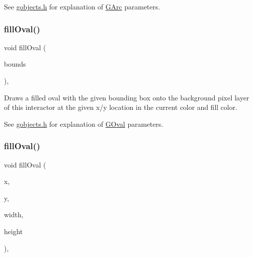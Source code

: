 See \mbox{\hyperlink{gobjects_8h_source}{gobjects.\+h}} for explanation of \mbox{\hyperlink{classsgl_1_1GArc}{G\+Arc}} parameters. \mbox{\label{classsgl_1_1GDrawingSurface_a1ea6e48d59fb588797dba4deab1397e0}} 
\subsubsection{\texorpdfstring{fill\+Oval()}{fillOval()}\hspace{0.1cm}{\footnotesize\ttfamily [1/2]}}
{\footnotesize\ttfamily void fill\+Oval (\begin{DoxyParamCaption}\item[{const \mbox{\hyperlink{structsgl_1_1GRectangle}{G\+Rectangle}} \&}]{bounds }\end{DoxyParamCaption})\hspace{0.3cm}{\ttfamily [virtual]}, {\ttfamily [inherited]}}



Draws a filled oval with the given bounding box onto the background pixel layer of this interactor at the given x/y location in the current color and fill color. 

See \mbox{\hyperlink{gobjects_8h_source}{gobjects.\+h}} for explanation of \mbox{\hyperlink{classsgl_1_1GOval}{G\+Oval}} parameters. \mbox{\label{classsgl_1_1GDrawingSurface_a28c700c82f31cd328a4629273420ee61}} 
\subsubsection{\texorpdfstring{fill\+Oval()}{fillOval()}\hspace{0.1cm}{\footnotesize\ttfamily [2/2]}}
{\footnotesize\ttfamily void fill\+Oval (\begin{DoxyParamCaption}\item[{double}]{x,  }\item[{double}]{y,  }\item[{double}]{width,  }\item[{double}]{height }\end{DoxyParamCaption})\hspace{0.3cm}{\ttfamily [virtual]}, {\ttfamily [inherited]}}



